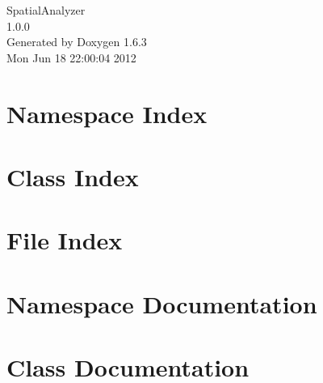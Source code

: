 \documentclass[a4paper]{book}
\begin{document}
\hypersetup{pageanchor=false}
\begin{titlepage}
\vspace*{7cm}
\begin{center}
{\Large SpatialAnalyzer \\[1ex]\large 1.0.0 }\\
\vspace*{1cm}
{\large Generated by Doxygen 1.6.3}\\
\vspace*{0.5cm}
{\small Mon Jun 18 22:00:04 2012}\\
\end{center}
\end{titlepage}
\clearemptydoublepage
{}
\tableofcontents
\clearemptydoublepage
{}
\hypersetup{pageanchor=true}
\chapter{Namespace Index}

\chapter{Class Index}

\chapter{File Index}

\chapter{Namespace Documentation}
















\chapter{Class Documentation}










\end{document}
